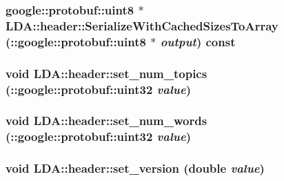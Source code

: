 \hypertarget{class_l_d_a_1_1header_a749a8161c81987cf66fa6f12fae54c1a}{
\subsubsection[{SerializeWithCachedSizesToArray}]{\setlength{\rightskip}{0pt plus 5cm}google::protobuf::uint8 $\ast$ LDA::header::SerializeWithCachedSizesToArray (::google::protobuf::uint8 $\ast$ {\em output}) const}}
\label{class_l_d_a_1_1header_a749a8161c81987cf66fa6f12fae54c1a}
\hypertarget{class_l_d_a_1_1header_aecfa2cccbc1b54a16c68b3d685e5c63c}{
\subsubsection[{set\_\-num\_\-topics}]{\setlength{\rightskip}{0pt plus 5cm}void LDA::header::set\_\-num\_\-topics (::google::protobuf::uint32 {\em value})}}
\label{class_l_d_a_1_1header_aecfa2cccbc1b54a16c68b3d685e5c63c}
\hypertarget{class_l_d_a_1_1header_a42f82bbe26a9cf2a0c75480a5b15701f}{
\subsubsection[{set\_\-num\_\-words}]{\setlength{\rightskip}{0pt plus 5cm}void LDA::header::set\_\-num\_\-words (::google::protobuf::uint32 {\em value})}}
\label{class_l_d_a_1_1header_a42f82bbe26a9cf2a0c75480a5b15701f}
\hypertarget{class_l_d_a_1_1header_a14647f0be369f87ffd298ae0044fa213}{
\subsubsection[{set\_\-version}]{\setlength{\rightskip}{0pt plus 5cm}void LDA::header::set\_\-version (double {\em value})}}

